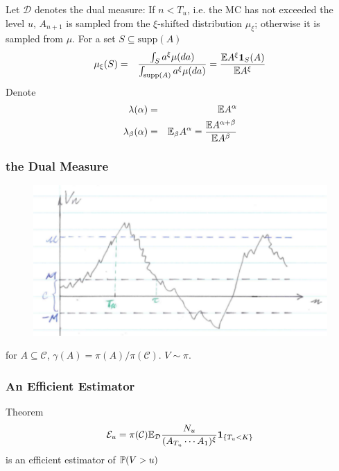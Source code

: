 \documentclass{beamer}
\begin{document}
\begin{frame}
  Let $\mathcal D$ denotes the dual measure:
  If $n < T_u$, i.e. the MC
  has not exceeded the level $u$, $A_{n+1}$ is sampled from the
  $\xi$-shifted distribution $\mu_\xi$; otherwise it is sampled from
  $\mu$. For a set $S \subseteq \text{supp}(A)$
  \begin{eqnarray*}
    \mu_\xi (S) &=& {
      \int_{S} a^\xi \mu(da)
      \over
      \int_{\text{supp}(A)} a^\xi \mu(da)
    } = {\E A^\xi \I{S}(A)
      \over
      \E A^\xi
    }
  \end{eqnarray*}
  Denote
  \begin{eqnarray*}
    \lambda(\alpha) &=& \E A^{\alpha} \\
    \lambda_\beta(\alpha) &=& \E_\beta A^{\alpha} = {
      \E A^{\alpha + \beta}
      \over
      \E A^{\beta}
    }
  \end{eqnarray*}  
\end{frame}

\begin{frame}
  \frametitle{the Dual Measure}
  \begin{figure}[htb!]
    \centering
    \includegraphics[scale=0.6]{pic1.pdf}
  \end{figure}
  for $A \subseteq \mathcal C$, $\gamma(A) = \pi(A)/\pi(\mathcal
  C)$. $V \sim \pi$.
\end{frame}

\begin{frame}
  \frametitle{An Efficient Estimator}
  \begin{block}{Theorem}
    \[
    \mathcal E_u = \pi(\mathcal C) \E_{\mathcal D} {N_u
      \over
      (A_{T_u} \cdots A_1)^\xi
    }\1{T_u < K}
    \]
    is an efficient estimator of $\P(V > u)$
  \end{block}
\end{frame}
\end{document}
